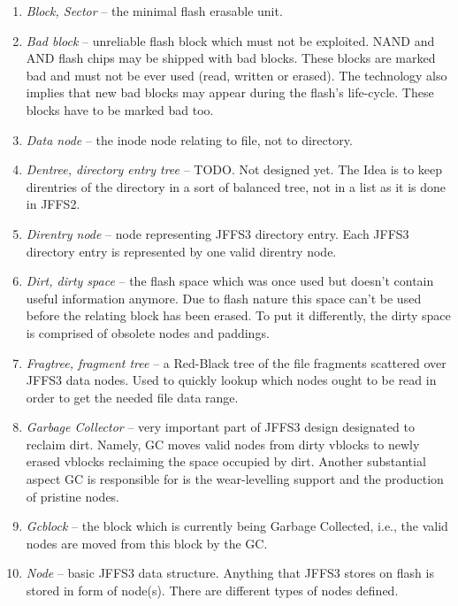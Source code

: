 \documentclass[12pt,a4paper,oneside,titlepage]{article}
\begin{document}
\begin{enumerate}
\item \emph{Block, Sector} --
the minimal flash erasable unit.

\item \emph{Bad block} -- unreliable flash block which must not be exploited.
NAND and AND flash chips may be shipped with bad blocks. These blocks are marked
bad and must not be ever used (read, written or erased). The technology also implies
that new bad blocks may appear during the flash's life-cycle. These blocks
have to be marked bad too.

\item \emph{Data node} -- the inode node relating to file, not to directory.

\item \emph{Dentree, directory entry tree} -- TODO. Not designed yet.
The Idea is to keep 
direntries of the directory in a sort of balanced tree, not in a list as
it is done in JFFS2.

\item \emph{Direntry node} -- node representing JFFS3 directory entry.
Each JFFS3 directory entry is represented by one valid direntry node.

\item \emph{Dirt, dirty space} -- the flash space which was once used
but doesn't contain useful information anymore. Due to flash nature this
space can't be used before the relating block has been erased. To put it
differently, the dirty space is comprised of obsolete nodes and
paddings.

\item \emph{Fragtree, fragment tree} -- a Red-Black tree of the file
fragments scattered over JFFS3 data nodes. Used to quickly lookup which
nodes ought to be read in order to get the needed file data range.

\item \emph{Garbage Collector} -- very important part of JFFS3
design designated to reclaim dirt. Namely, GC moves
valid nodes from dirty vblocks to newly erased vblocks reclaiming the space
occupied by dirt. Another substantial aspect GC is responsible for is
the wear-levelling support and the production of pristine nodes.

\item \emph{Gcblock} -- the block which is currently being Garbage
Collected, i.e., the valid nodes are moved from this block by the GC.

\item \emph{Node} --
basic JFFS3 data structure. Anything that JFFS3 stores on flash is
stored in form of node(s). There are different types of nodes defined.


\end{enumerate}
\end{document}
